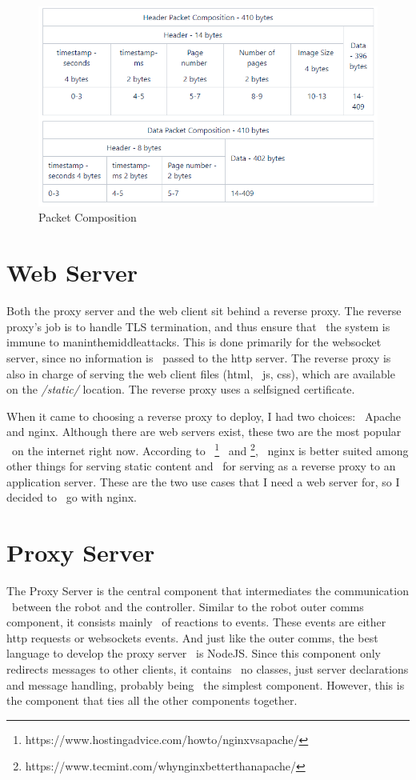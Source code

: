 \begin{figure}[ht]
    \label{fig:udp-packer-packet-composition}
    \includegraphics{img/packet-composition.PNG}
    \caption{Packet Composition}
\end{figure}


\section{Web Server}
\label{sec:web-server}
Both the proxy server and the web client sit behind a reverse proxy.
The reverse proxy's job is to handle TLS termination, and thus ensure that \
the system is immune to man\-in\-the\-middle\-attacks.
This is done primarily for the websocket server, since no information is \
passed to the http server.
The reverse proxy is also in charge of serving the web client files (html, \
js, css), which are available on the \textit{/static/} location.
The reverse proxy uses a self\-signed certificate.

When it came to choosing a reverse proxy to deploy, I had two choices: \
Apache and nginx.
Although there are web servers exist, these two are the most popular \
on the internet right now.
According to \
\footnote{https://www.hostingadvice.com/how\-to/nginx\-vs\-apache/} \
and \footnote{https://www.tecmint.com/why\-nginx\-better\-than\-apache/}, \
nginx is better suited among other things for serving static content and \
for serving as a reverse proxy to an application server.
These are the two use cases that I need a web server for, so I decided to \
go with nginx.



\section{Proxy Server}
\label{sec:implementation-proxy-server}
The Proxy Server is the central component that intermediates the communication \
between the robot and the controller.
Similar to the robot outer comms component, it consists mainly \
of reactions to events.
These events are either http requests or websockets events.
And just like the outer comms, the best language to develop the proxy server \
is NodeJS.
Since this component only redirects messages to other clients, it contains \
no classes, just server declarations and message handling, probably being \
the simplest component.
However, this is the component that ties all the other components together.

